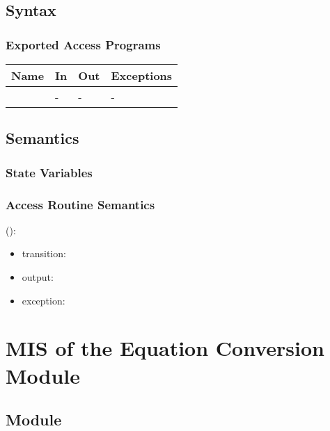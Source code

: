 \documentclass[12pt, titlepage]{article}
\begin{document}
\subsection{Syntax}

\subsubsection{Exported Access Programs}

\begin{center}
	\begin{tabular}{p{3cm} p{4cm} p{4cm} p{2cm}}
		\hline
		\textbf{Name} & \textbf{In} & \textbf{Out} & \textbf{Exceptions} \\
		\hline
		\wss{accessProg} & - & - & - \\
		\hline
	\end{tabular}
\end{center}

\subsection{Semantics}

\subsubsection{State Variables}


\subsubsection{Access Routine Semantics}

\noindent {}():
\begin{itemize}
	\item transition:  
	\item output:  
	\item exception:  
\end{itemize}

\newpage

\section{MIS of the Equation Conversion Module} 
\label{Module_equationconversion}

\subsection{Module}
\end{document}
